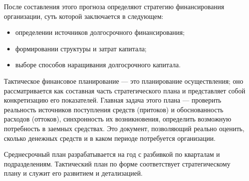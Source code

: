 После составления этого прогноза определяют стратегию финансирования организации, суть которой заключается в следующем:
\begin{itemize}
	\item определении источников долгосрочного финансирования;
	\item формировании структуры и затрат капитала;
	\item выборе способов наращивания долгосрочного капитала.
\end{itemize}

Тактическое финансовое планирование --- это планирование осуществления; оно рассматривается как составная часть стратегического плана и представляет собой конкретизацию его показателей.
Главная задача этого плана --- проверить реальность источников поступления средств (притоков) и обоснованность расходов (оттоков), синхронность их возникновения, определить возможную потребность в заемных средствах.
Это документ, позволяющий реально оценить, сколько денежных средств и в каком периоде потребуется организации.

Среднесрочный план разрабатывается на год с разбивкой по кварталам и подразделениям.
Тактический план по форме соответствует стратегическому плану и служит его развитием и детализацией.